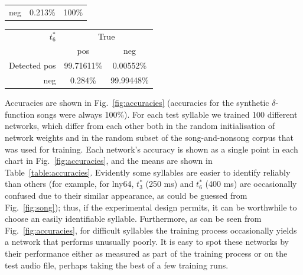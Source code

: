 \documentclass[10pt,letterpaper]{article}
\newcommand\fig[1]{Fig.~\ref{#1}}
\begin{document}
{\begin{tabular}{r|cc}
    neg & 0.213\% & 100\%\\ 
  \end{tabular}
  \vspace{8pt}\par\noindent
  \begin{tabular}{r|cc}
    $t^*_6$ & \multicolumn{2}{c}{True} \\ 
    & pos & neg \\ 
    \hline  Detected pos & 99.71611\% & 0.00552\%\\ 
    neg & 0.284\% & 99.99448\%\\ 
  \end{tabular}
  \vspace{8pt}\par\noindent
}

Accuracies are shown in \fig{fig:accuracies} (accuracies for the synthetic $\delta$-function
songs were always 100\%).  For each test syllable we trained 100
different networks, which differ from each other both in the random
initialisation of network weights and in the random subset of the
song-and-nonsong corpus that was used for training.  Each network's
accuracy is shown as a single point in each chart in
\fig{fig:accuracies}, and the means are shown in
Table~\ref{table:accuracies}.  Evidently some syllables are easier to
identify reliably than others (for example, for lny64, $t^*_3$ (250 ms) and $t^*_6$ (400 ms) are
occasionally confused due to their similar appearance, as could be
guessed from \fig{fig:song}); thus, if the experimental design
permits, it can be worthwhile to choose an easily identifiable
syllable.  Furthermore, as can be seen from \fig{fig:accuracies}, for
difficult syllables the training process occasionally yields a network
that performs unusually poorly.  It is easy to spot these networks by
their performance either as measured as part of the training process
or on the test audio file, perhaps taking the best of a few training
runs.
\end{document}
